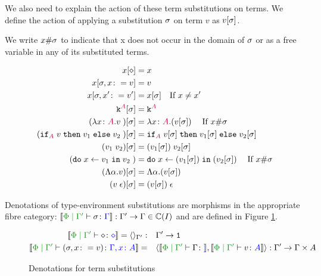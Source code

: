 \documentclass{Report}
\begin{document}
We also need to explain the action of these term substitutions on terms. We define the action of applying a substitution $\sigma$  on term $v$ as $v[\sigma]$. 


\begin{framed}
    \begin{definition}[Freshness]
        We write $x\#\sigma$ to indicate that x does not occur in the domain of $\sigma$ or as a free variable in any of its substituted terms.
    \end{definition}
\end{framed}

\begin{align*}
    x[\diamond] & = x \\
    x[\sigma,x\colon= v] & = v \\
    x[\sigma,x'\colon= v'] & = x[\sigma]\quad\text{If }x \neq x'\\
    \texttt{k}^{\color{purple} A}[\sigma] & = \texttt{k}^{\color{purple} A} \\
    (\lambda x \colon {\color{purple}A}. v\;)[\sigma] &= \lambda x \colon {\color{purple}A}. (v[\sigma])\;\quad\text{If }x\#\sigma\\
    (\texttt{if}_{\textcolor{purple}{A}}\; v\; \texttt{then}\; v_1 \;\texttt{else} \; v_2\;)[\sigma] &= \texttt{if}_{\textcolor{purple}{A}}\; v[\sigma]\; \texttt{then}\; v_1[\sigma] \;\texttt{else} \; v_2[\sigma]\;\\
    (v_1\; v_2)[\sigma]&= (v_1[\sigma])\; v_2[\sigma]\\
    (\texttt{do}\; x \leftarrow v_1 \;\texttt{in}\; v_2\;)&= \texttt{do}\; x \leftarrow (v_1[\sigma]) \;\texttt{in}\; (v_2[\sigma])\;\quad\text{If } x\#\sigma\\
    (\Lambda \alpha. v)[\sigma] & = \Lambda \alpha. (v[\sigma])\\
    (v\;\epsilon)[\sigma] & = (v[\sigma])\;\epsilon\\
\end{align*}

Denotations of type-environment substitutions are morphisms in the appropriate fibre category: $\deno{\etyperelation{\P}{\G'}{\si}{\G}}: \G' \rightarrow \G \in \C(I)$ and are defined in Figure \ref{TermSubstitutionDenotations}.

\begin{figure}[H]
    \centering
    \begin{framed}
\begin{align*}
    \deno{\etyperelation{\P}{\G'}{\nil}{\nil}} = \term{\G'}:&\quad \G' \rightarrow \1
    \\
    \deno{\etyperelation{\P}{\G'}{(\si, x \setto v)}{\gax}} =&\quad \pr{\deno{\etyperelation{\P}{\G'}{\G}}}{\deno{\etyperelation{\P}{\G'}{v}{A}}}: \G' \rightarrow \G\times A
\end{align*}
    \end{framed}
    \caption{Denotations for term substitutions}
    \label{TermSubstitutionDenotations}
\end{figure}
\end{document}
